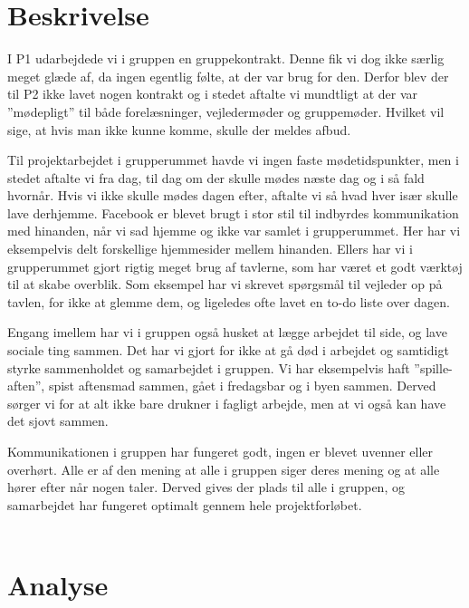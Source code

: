 \section{Beskrivelse}
I P1 udarbejdede vi i gruppen en gruppekontrakt. Denne fik vi dog ikke særlig meget glæde af, da ingen egentlig følte, at der var brug for den. Derfor blev der til P2 ikke lavet nogen kontrakt og i stedet aftalte vi mundtligt at der var ”mødepligt” til både forelæsninger, vejledermøder og gruppemøder. Hvilket vil sige, at hvis man ikke kunne komme, skulle der meldes afbud.

Til projektarbejdet i grupperummet havde vi ingen faste mødetidspunkter, men i stedet aftalte vi fra dag, til dag om der skulle mødes næste dag og i så fald hvornår. Hvis vi ikke skulle mødes dagen efter, aftalte vi så hvad hver især skulle lave derhjemme.
Facebook er blevet brugt i stor stil til indbyrdes kommunikation med hinanden, når vi sad hjemme og ikke var samlet i grupperummet. Her har vi eksempelvis delt forskellige hjemmesider mellem hinanden. 
Ellers har vi i grupperummet gjort rigtig meget brug af tavlerne, som har været et godt værktøj til at skabe overblik. Som eksempel har vi skrevet spørgsmål til vejleder op på tavlen, for ikke at glemme dem, og ligeledes ofte lavet en to-do liste over dagen. 

Engang imellem har vi i gruppen også husket at lægge arbejdet til side, og lave sociale ting sammen. Det har vi gjort for ikke at gå død i arbejdet og samtidigt styrke sammenholdet og samarbejdet i gruppen. Vi har eksempelvis haft ”spille-aften”, spist aftensmad sammen, gået i fredagsbar og i byen sammen. Derved sørger vi for at alt ikke bare drukner i fagligt arbejde, men at vi også kan have det sjovt sammen.

Kommunikationen i gruppen har fungeret godt, ingen er blevet uvenner eller overhørt. Alle er af den mening at alle i gruppen siger deres mening og at alle hører efter når nogen taler. Derved gives der plads til alle i gruppen, og  samarbejdet har fungeret optimalt gennem hele projektforløbet.
\\
\\

\section{Analyse}

